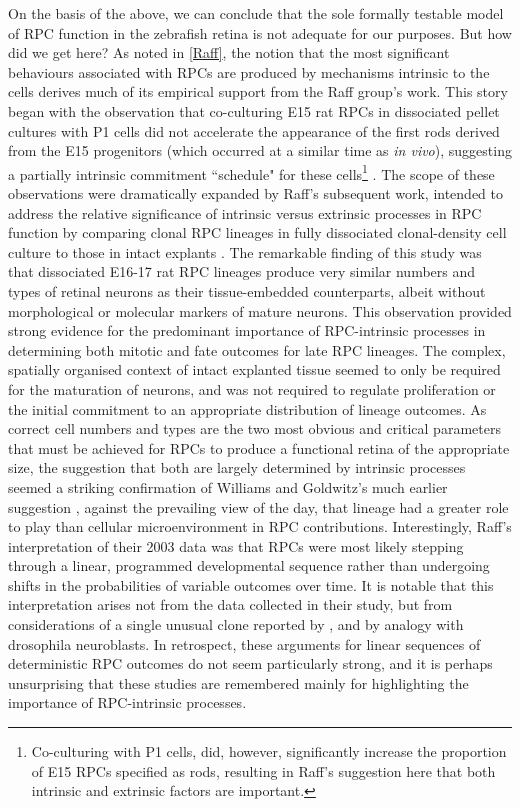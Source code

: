 On the basis of the above, we can conclude that the sole formally testable model of RPC function in the zebrafish retina is not adequate for our purposes. But how did we get here? As noted in \autoref{Raff}, the notion that the most significant behaviours associated with RPCs are produced by mechanisms intrinsic to the cells derives much of its empirical support from the Raff group's work. This story began with the observation that co-culturing E15 rat RPCs in dissociated pellet cultures with P1 cells did not accelerate the appearance of the first rods derived from the E15 progenitors (which occurred at a similar time as \textit{in vivo}), suggesting a partially intrinsic commitment ``schedule" for these cells\footnote{Co-culturing with P1 cells, did, however, significantly increase the proportion of E15 RPCs specified as rods, resulting in Raff's suggestion here that both intrinsic and extrinsic factors are important.} \cite{Watanabe1990}. The scope of these observations were dramatically expanded by Raff's subsequent work, intended to address the relative significance of intrinsic versus extrinsic processes in RPC function by comparing clonal RPC lineages in fully dissociated clonal-density cell culture to those in intact explants \cite{Cayouette2003}. The remarkable finding of this study was that dissociated E16-17 rat RPC lineages produce very similar numbers and types of retinal neurons as their tissue-embedded counterparts, albeit without morphological or molecular markers of mature neurons. This observation provided strong evidence for the predominant importance of RPC-intrinsic processes in determining both mitotic and fate outcomes for late RPC lineages. The complex, spatially organised context of intact explanted tissue seemed to only be required for the maturation of neurons, and was not required to regulate proliferation or the initial commitment to an appropriate distribution of lineage outcomes. As correct cell numbers and types are the two most obvious and critical parameters that must be achieved for RPCs to produce a functional retina of the appropriate size, the suggestion that both are largely determined by intrinsic processes seemed a striking confirmation of Williams and Goldwitz's much earlier suggestion \cite{Williams1992}, against the prevailing view of the day, that lineage had a greater role to play than cellular microenvironment in RPC contributions. Interestingly, Raff's interpretation of their 2003 data was that RPCs were most likely stepping through a linear, programmed developmental sequence rather than undergoing shifts in the probabilities of variable outcomes over time. It is notable that this interpretation arises not from the data collected in their study, but from considerations of a single unusual clone reported by \cite{Turner1990}, and by analogy with drosophila neuroblasts. In retrospect, these arguments for linear sequences of deterministic RPC outcomes do not seem particularly strong, and it is perhaps unsurprising that these studies are remembered mainly for highlighting the importance of RPC-intrinsic processes.

